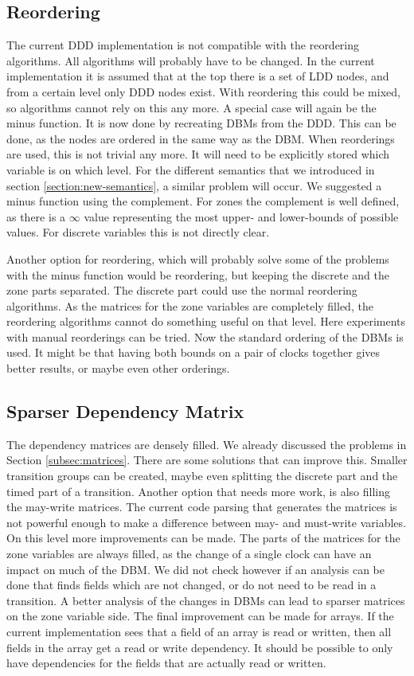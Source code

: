 \subsection{Reordering}
The current DDD implementation is not compatible with the reordering algorithms. All algorithms will probably have to be changed. In the current implementation it is assumed that at the top there is a set of LDD nodes, and from a certain level only DDD nodes exist. With reordering this could be mixed, so algorithms cannot rely on this any more. A special case will again be the minus function. It is now done by recreating DBMs from the DDD. This can be done, as the nodes are ordered in the same way as the DBM. When reorderings are used, this is not trivial any more. It will need to be explicitly stored which variable is on which level. For the different semantics that we introduced in section \ref{section:new-semantics}, a similar problem will occur. We suggested a minus function using the complement. For zones the complement is well defined, as there is a $\infty$ value representing the most upper- and lower-bounds of possible values. For discrete variables this is not directly clear.
 
Another option for reordering, which will probably solve some of the problems with the minus function would be reordering, but keeping the discrete and the zone parts separated. The discrete part could use the normal reordering algorithms. As the matrices for the zone variables are completely filled, the reordering algorithms cannot do something useful on that level. Here experiments with manual reorderings can be tried. Now the standard ordering of the DBMs is used. It might be that having both bounds on a pair of clocks together gives better results, or maybe even other orderings.

\subsection{Sparser Dependency Matrix}
The dependency matrices are densely filled. We already discussed the problems in Section \ref{subsec:matrices}. There are some solutions that can improve this. Smaller transition groups can be created, maybe even splitting the discrete part and the timed part of a transition. Another option that needs more work, is also filling the may-write matrices. The current code parsing that generates the matrices is not powerful enough to make a difference between may- and must-write variables. On this level more improvements can be made. The parts of the matrices for the zone variables are always filled, as the change of a single clock can have an impact on much of the DBM. We did not check however if an analysis can be done that finds fields which are not changed, or do not need to be read in a transition. A better analysis of the changes in DBMs can lead to sparser matrices on the zone variable side. The final improvement can be made for arrays. If the current implementation sees that a field of an array is read or written, then all fields in the array get a read or write dependency. It should be possible to only have dependencies for the fields that are actually read or written.

